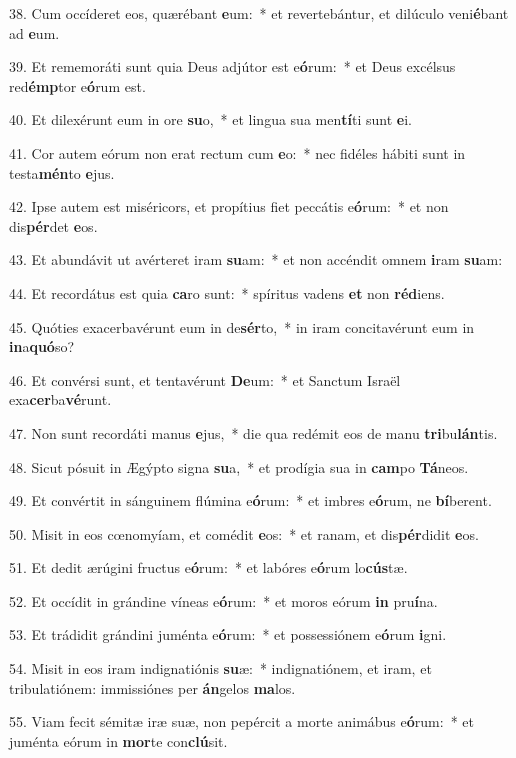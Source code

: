 38. Cum occíderet eos, quærébant \textbf{e}um:~*  et revertebántur, et dilúculo veni\textbf{é}bant ad \textbf{e}um.\

39. Et rememoráti sunt quia Deus adjútor est e\textbf{ó}rum:~*  et Deus excélsus red\textbf{émp}tor e\textbf{ó}rum est.\

40. Et dilexérunt eum in ore \textbf{su}o,~*  et lingua sua men\textbf{tí}ti sunt \textbf{e}i.\

41. Cor autem eórum non erat rectum cum \textbf{e}o:~*  nec fidéles hábiti sunt in testa\textbf{mén}to \textbf{e}jus.\

42. Ipse autem est miséricors, et propítius fiet peccátis e\textbf{ó}rum:~*  et non dis\textbf{pér}det \textbf{e}os.\

43. Et abundávit ut avérteret iram \textbf{su}am:~*  et non accéndit omnem \textbf{i}ram \textbf{su}am:\

44. Et recordátus est quia \textbf{ca}ro sunt:~*  spíritus vadens \textbf{et} non \textbf{réd}iens.\

45. Quóties exacerbavérunt eum in de\textbf{sér}to,~*  in iram concitavérunt eum in \textbf{in}a\textbf{quó}so?\

46. Et convérsi sunt, et tentavérunt \textbf{De}um:~*  et Sanctum Israël exa\textbf{cer}ba\textbf{vé}runt.\

47. Non sunt recordáti manus \textbf{e}jus,~*  die qua redémit eos de manu \textbf{tri}bu\textbf{lán}tis.\

48. Sicut pósuit in Ægýpto signa \textbf{su}a,~*  et prodígia sua in \textbf{cam}po \textbf{Tá}neos.\

49. Et convértit in sánguinem flúmina e\textbf{ó}rum:~*  et imbres e\textbf{ó}rum, ne \textbf{bí}berent.\

50. Misit in eos cœnomyíam, et comédit \textbf{e}os:~*  et ranam, et dis\textbf{pér}didit \textbf{e}os.\

51. Et dedit ærúgini fructus e\textbf{ó}rum:~*  et labóres e\textbf{ó}rum lo\textbf{cús}tæ.\

52. Et occídit in grándine víneas e\textbf{ó}rum:~*  et moros eórum \textbf{in} pru\textbf{í}na.\

53. Et trádidit grándini juménta e\textbf{ó}rum:~*  et possessiónem e\textbf{ó}rum \textbf{i}gni.\

54. Misit in eos iram indignatiónis \textbf{su}æ:~*  indignatiónem, et iram, et tribulatiónem: immissiónes per \textbf{án}gelos \textbf{ma}los.\

55. Viam fecit sémitæ iræ suæ, non pepércit a morte animábus e\textbf{ó}rum:~*  et juménta eórum in \textbf{mor}te con\textbf{clú}sit.\

